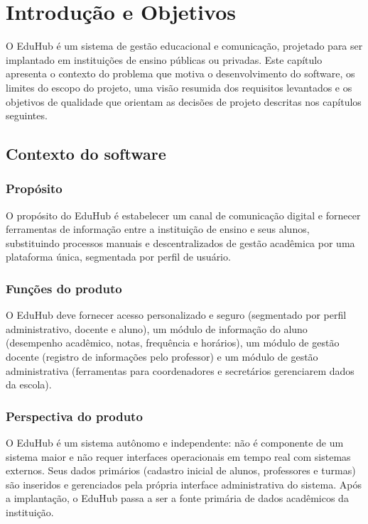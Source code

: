 \chapter{Introdução e Objetivos}

O EduHub é um sistema de gestão educacional e comunicação, projetado para ser
implantado em instituições de ensino públicas ou privadas. Este capítulo
apresenta o contexto do problema que motiva o desenvolvimento do software, os
limites do escopo do projeto, uma visão resumida dos requisitos levantados e
os objetivos de qualidade que orientam as decisões de projeto descritas nos
capítulos seguintes.

\section{Contexto do software}

\subsection{Propósito}

O propósito do EduHub é estabelecer um canal de comunicação digital e
fornecer ferramentas de informação entre a instituição de ensino e seus
alunos, substituindo processos manuais e descentralizados de gestão
acadêmica por uma plataforma única, segmentada por perfil de usuário.

\subsection{Funções do produto}

O EduHub deve fornecer acesso personalizado e seguro (segmentado por perfil
administrativo, docente e aluno), um módulo de informação do aluno
(desempenho acadêmico, notas, frequência e horários), um módulo de gestão
docente (registro de informações pelo professor) e um módulo de gestão
administrativa (ferramentas para coordenadores e secretários gerenciarem
dados da escola).

\subsection{Perspectiva do produto}

O EduHub é um sistema autônomo e independente: não é componente de um
sistema maior e não requer interfaces operacionais em tempo real com
sistemas externos. Seus dados primários (cadastro inicial de alunos,
professores e turmas) são inseridos e gerenciados pela própria interface
administrativa do sistema. Após a implantação, o EduHub passa a ser a fonte
primária de dados acadêmicos da instituição.

